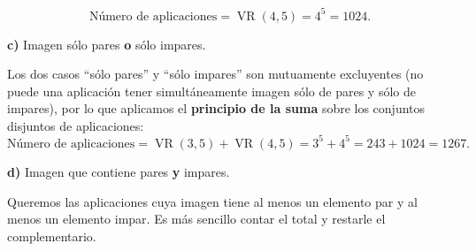 \documentclass[a4paper,12pt]{article}
\begin{document}
\begin{ejercicio}[title=Ejercicio 20]
\[
\text{Número de aplicaciones} = \operatorname{VR}(4,5) = 4^{5} = \boxed{1024}.
\]

\vspace{0.5em}

\textbf{c)} Imagen sólo pares \textbf{o} sólo impares.

\vspace{0.5em}

Los dos casos “sólo pares” y “sólo impares” son mutuamente excluyentes (no puede una aplicación tener simultáneamente imagen sólo de pares y sólo de impares), por lo que aplicamos el \textbf{principio de la suma} sobre los conjuntos disjuntos de aplicaciones:
\[
\text{Número de aplicaciones} = \operatorname{VR}(3,5) + \operatorname{VR}(4,5) = 3^{5} + 4^{5} = 243 + 1024 = \boxed{1267}.
\]

\vspace{0.5em}

\textbf{d)} Imagen que contiene pares \textbf{y} impares.

\vspace{0.5em}

Queremos las aplicaciones cuya imagen tiene al menos un elemento par y al menos un elemento impar. Es más sencillo contar el total y restarle el  complementario.

\end{ejercicio}
\end{document}
